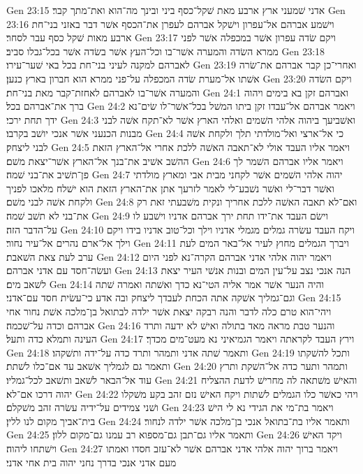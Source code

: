 Gen 23:15  אדני שׁמעני ארץ ארבע מאת שׁקל־כסף ביני ובינך מה־הוא ואת־מתך קבר׃
Gen 23:16  וישׁמע אברהם אל־עפרון וישׁקל אברהם לעפרן את־הכסף אשׁר דבר באזני בני־חת ארבע מאות שׁקל כסף עבר לסחר׃
Gen 23:17  ויקם שׂדה עפרון אשׁר במכפלה אשׁר לפני ממרא השׂדה והמערה אשׁר־בו וכל־העץ אשׁר בשׂדה אשׁר בכל־גבלו סביב׃
Gen 23:18  לאברהם למקנה לעיני בני־חת בכל באי שׁער־עירו׃
Gen 23:19  ואחרי־כן קבר אברהם את־שׂרה אשׁתו אל־מערת שׂדה המכפלה על־פני ממרא הוא חברון בארץ כנען׃
Gen 23:20  ויקם השׂדה והמערה אשׁר־בו לאברהם לאחזת־קבר מאת בני־חת׃
Gen 24:1  ואברהם זקן בא בימים ויהוה ברך את־אברהם בכל׃
Gen 24:2  ויאמר אברהם אל־עבדו זקן ביתו המשׁל בכל־אשׁר־לו שׂים־נא ידך תחת ירכי׃
Gen 24:3  ואשׁביעך ביהוה אלהי השׁמים ואלהי הארץ אשׁר לא־תקח אשׁה לבני מבנות הכנעני אשׁר אנכי יושׁב בקרבו׃
Gen 24:4  כי אל־ארצי ואל־מולדתי תלך ולקחת אשׁה לבני ליצחק׃
Gen 24:5  ויאמר אליו העבד אולי לא־תאבה האשׁה ללכת אחרי אל־הארץ הזאת ההשׁב אשׁיב את־בנך אל־הארץ אשׁר־יצאת משׁם׃
Gen 24:6  ויאמר אליו אברהם השׁמר לך פן־תשׁיב את־בני שׁמה׃
Gen 24:7  יהוה אלהי השׁמים אשׁר לקחני מבית אבי ומארץ מולדתי ואשׁר דבר־לי ואשׁר נשׁבע־לי לאמר לזרעך אתן את־הארץ הזאת הוא ישׁלח מלאכו לפניך ולקחת אשׁה לבני משׁם׃
Gen 24:8  ואם־לא תאבה האשׁה ללכת אחריך ונקית משׁבעתי זאת רק את־בני לא תשׁב שׁמה׃
Gen 24:9  וישׂם העבד את־ידו תחת ירך אברהם אדניו וישׁבע לו על־הדבר הזה׃
Gen 24:10  ויקח העבד עשׂרה גמלים מגמלי אדניו וילך וכל־טוב אדניו בידו ויקם וילך אל־ארם נהרים אל־עיר נחור׃
Gen 24:11  ויברך הגמלים מחוץ לעיר אל־באר המים לעת ערב לעת צאת השׁאבת׃
Gen 24:12  ויאמר יהוה אלהי אדני אברהם הקרה־נא לפני היום ועשׂה־חסד עם אדני אברהם׃
Gen 24:13  הנה אנכי נצב על־עין המים ובנות אנשׁי העיר יצאת לשׁאב מים׃
Gen 24:14  והיה הנער אשׁר אמר אליה הטי־נא כדך ואשׁתה ואמרה שׁתה וגם־גמליך אשׁקה אתה הכחת לעבדך ליצחק ובה אדע כי־עשׂית חסד עם־אדני׃
Gen 24:15  ויהי־הוא טרם כלה לדבר והנה רבקה יצאת אשׁר ילדה לבתואל בן־מלכה אשׁת נחור אחי אברהם וכדה על־שׁכמה׃
Gen 24:16  והנער טבת מראה מאד בתולה ואישׁ לא ידעה ותרד העינה ותמלא כדה ותעל׃
Gen 24:17  וירץ העבד לקראתה ויאמר הגמיאיני נא מעט־מים מכדך׃
Gen 24:18  ותאמר שׁתה אדני ותמהר ותרד כדה על־ידה ותשׁקהו׃
Gen 24:19  ותכל להשׁקתו ותאמר גם לגמליך אשׁאב עד אם־כלו לשׁתת׃
Gen 24:20  ותמהר ותער כדה אל־השׁקת ותרץ עוד אל־הבאר לשׁאב ותשׁאב לכל־גמליו׃
Gen 24:21  והאישׁ משׁתאה לה מחרישׁ לדעת ההצליח יהוה דרכו אם־לא׃
Gen 24:22  ויהי כאשׁר כלו הגמלים לשׁתות ויקח האישׁ נזם זהב בקע משׁקלו ושׁני צמידים על־ידיה עשׂרה זהב משׁקלם׃
Gen 24:23  ויאמר בת־מי את הגידי נא לי הישׁ בית־אביך מקום לנו ללין׃
Gen 24:24  ותאמר אליו בת־בתואל אנכי בן־מלכה אשׁר ילדה לנחור׃
Gen 24:25  ותאמר אליו גם־תבן גם־מספוא רב עמנו גם־מקום ללון׃
Gen 24:26  ויקד האישׁ וישׁתחו ליהוה׃
Gen 24:27  ויאמר ברוך יהוה אלהי אדני אברהם אשׁר לא־עזב חסדו ואמתו מעם אדני אנכי בדרך נחני יהוה בית אחי אדני׃
